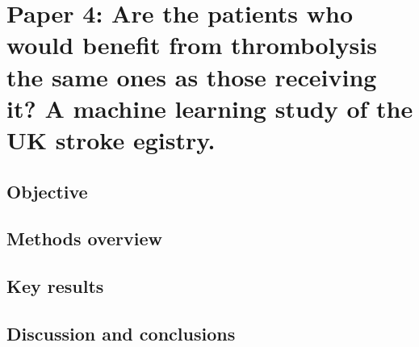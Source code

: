 \section{Paper 4: Are the patients who would benefit from thrombolysis the same ones as those receiving it? A machine learning study of the UK stroke egistry.\cite{pearn_are_2024}}\label{sec:paper_4}

\subsection{Objective}

\subsection{Methods overview}

\subsection{Key results}

\subsection{Discussion and conclusions}